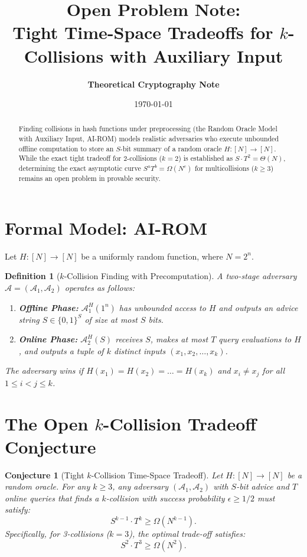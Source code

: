 \documentclass[11pt,a4paper]{article}
\title{\textbf{\Large Open Problem Note:}\\[0.2em] \Large Tight Time-Space Tradeoffs for $k$-Collisions with Auxiliary Input}
\author{\textbf{Theoretical Cryptography Note}}
\date{\today}
\newtheorem{conjecture}{Conjecture}
\newtheorem{definition}{Definition}
\begin{document}
\maketitle

\begin{abstract}
Finding collisions in hash functions under preprocessing (the Random Oracle Model with Auxiliary Input, AI-ROM) models realistic adversaries who execute unbounded offline computation to store an $S$-bit summary of a random oracle $H : [N] \to [N]$. While the exact tight tradeoff for 2-collisions ($k=2$) is established as $S \cdot T^2 = \Theta(N)$, determining the exact asymptotic curve $S^a T^b = \Omega(N^c)$ for multicollisions ($k \ge 3$) remains an open problem in provable security.
\end{abstract}

\section{Formal Model: AI-ROM}

Let $H : [N] \to [N]$ be a uniformly random function, where $N = 2^n$.

\begin{definition}[$k$-Collision Finding with Precomputation]
A two-stage adversary $\mathcal{A} = (\mathcal{A}_1, \mathcal{A}_2)$ operates as follows:
\begin{enumerate}[label=\roman*.]
    \item \textbf{Offline Phase:} $\mathcal{A}_1^H(1^n)$ has unbounded access to $H$ and outputs an advice string $S \in \{0,1\}^S$ of size at most $S$ bits.
    \item \textbf{Online Phase:} $\mathcal{A}_2^H(S)$ receives $S$, makes at most $T$ query evaluations to $H$, and outputs a tuple of $k$ distinct inputs $(x_1, x_2, \dots, x_k)$.
\end{enumerate}
The adversary wins if $H(x_1) = H(x_2) = \dots = H(x_k)$ and $x_i \neq x_j$ for all $1 \le i < j \le k$.
\end{definition}

\section{The Open $k$-Collision Tradeoff Conjecture}

\begin{conjecture}[Tight $k$-Collision Time-Space Tradeoff]
Let $H : [N] \to [N]$ be a random oracle. For any $k \ge 3$, any adversary $(\mathcal{A}_1, \mathcal{A}_2)$ with $S$-bit advice and $T$ online queries that finds a $k$-collision with success probability $\epsilon \ge 1/2$ must satisfy:
\begin{equation}
S^{k-1} \cdot T^{k} \ge \Omega\left( N^{k-1} \right).
\end{equation}
Specifically, for 3-collisions ($k=3$), the optimal trade-off satisfies:
\begin{equation}
S^2 \cdot T^3 \ge \Omega\left( N^2 \right).
\end{equation}
\end{conjecture}
\end{document}
